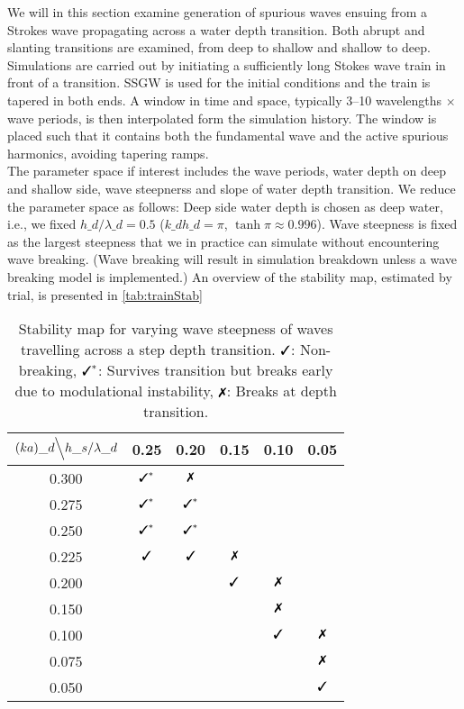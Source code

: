 %
%
%

We will in this section examine generation of spurious waves ensuing from a Strokes wave propagating across a water depth transition. Both abrupt and slanting transitions are examined, from deep to shallow and shallow to deep.
Simulations are carried out by initiating a sufficiently long Stokes wave train in front of a transition.  
SSGW is used for the initial conditions and the train is tapered in both ends.
A window in time and space, typically 3--10 wavelengths $\times$ wave periods, is then interpolated form the simulation history. The window is placed such that it contains both the fundamental wave and the active spurious harmonics, avoiding tapering ramps.\\

The parameter space if interest includes the wave periods, water depth on deep and shallow side, wave steepnerss and slope of water depth transition.
We reduce the parameter space as follows: Deep side water depth is chosen as deep water,
i.e., we fixed $h\_d/\lambda\_d=0.5$ ($k\_dh\_d=\pi$, $\tanh\pi\approx0.996$).
Wave steepness is fixed as the largest steepness that we in practice can simulate without encountering wave breaking. 
(Wave breaking will result in simulation breakdown unless a wave breaking model is implemented.)
An overview of the stability map, estimated by trial, is presented in \autoref{tab:trainStab}
\\

\begin{table}[H]%
\centering
\begin{tabular}{c|ccccc}
$(ka)\_d\Big\backslash h\_s/\lambda\_d$		&0.25	 &0.20      &0.15&0.10&0.05\\\hline
0.300  	& $\cmark^*$ & $\xmark$ &  &&	\\
0.275  &$\cmark^*$&$\cmark^*$&&&\\
0.250  &$\cmark^*$&$\cmark^*$&&&\\
0.225 &$\cmark$& $\cmark$& $\xmark$ &&\\
0.200 &&&$\cmark$&$\xmark$&\\
0.150 &&&&$\xmark$&\\
0.100  &&&&$\cmark$& $\xmark$\\
0.075 &&&&& $\xmark$\\
0.050 &&&&&$\cmark$
\end{tabular}
\caption{Stability map for varying wave steepness of waves travelling across a step depth transition. $\cmark$: Non-breaking, $\cmark^*$: Survives transition but breaks early due to modulational instability, $\xmark$: Breaks at depth transition.}
\label{tab:trainStab}
\end{table}


